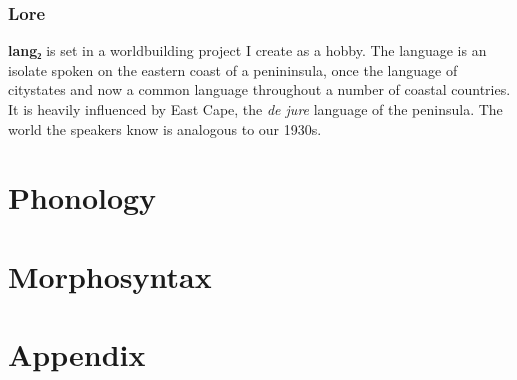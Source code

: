 \documentclass[fontsize=12pt,twoside=false,numbers=noenddot]{kaobook}
\newcommand{\langname}{\textbf{lang₂}}
\begin{document}
\section{Lore}
\langname{} is set in a worldbuilding project I create as a hobby. The language is an isolate spoken on the eastern coast of a penininsula, once the language of citystates and now a common language throughout a number of coastal countries. It is heavily influenced by East Cape, the \emph{de jure} language of the peninsula. The world the speakers know is analogous to our 1930s.

\mainmatter

 \part{Phonology} 



 \part{Morphosyntax} 











 \part{Appendix} 

\appendix





\backmatter
{}

\end{document}
